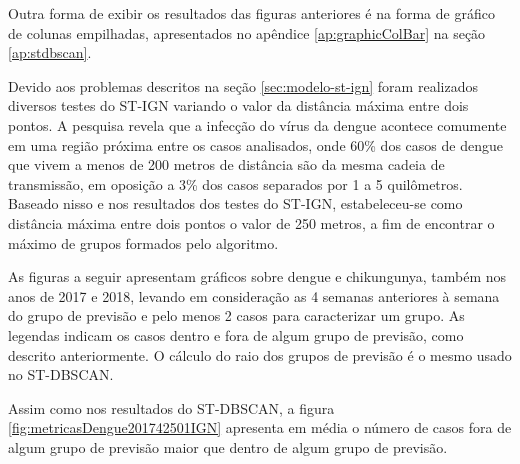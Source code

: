 Outra forma de exibir os resultados das figuras anteriores é na forma de gráfico de colunas empilhadas, apresentados no apêndice \ref{ap:graphicColBar} na seção \ref{ap:stdbscan}.

Devido aos problemas descritos na seção \ref{sec:modelo-st-ign} foram realizados diversos testes do ST-IGN variando o valor da distância máxima entre dois pontos. A pesquisa \cite{Salje2017} revela que a infecção do vírus da dengue acontece comumente em uma região próxima entre os casos analisados, onde 60\% dos casos de dengue que vivem a menos de 200 metros de distância são da mesma cadeia de transmissão, em oposição a 3\% dos casos separados por 1 a 5 quilômetros. Baseado nisso e nos resultados dos testes do ST-IGN, estabeleceu-se como distância máxima entre dois pontos o valor de 250 metros, a fim de encontrar o máximo de grupos formados pelo algoritmo.

As figuras a seguir apresentam gráficos sobre dengue e chikungunya, também nos anos de 2017 e 2018, levando em consideração as 4 semanas anteriores à semana do grupo de previsão e pelo menos 2 casos para caracterizar um grupo. As legendas indicam os casos dentro e fora de algum grupo de previsão, como descrito anteriormente. O cálculo do raio dos grupos de previsão é o mesmo usado no \acrshort{ST-DBSCAN}.


Assim como nos resultados do \acrshort{ST-DBSCAN}, a figura \ref{fig:metricasDengue201742501IGN} apresenta em média o número de casos fora de algum grupo de previsão maior que dentro de algum grupo de previsão.

\begin{figure}[!ht]
	\centering	
\end{figure}
\FloatBarrier

